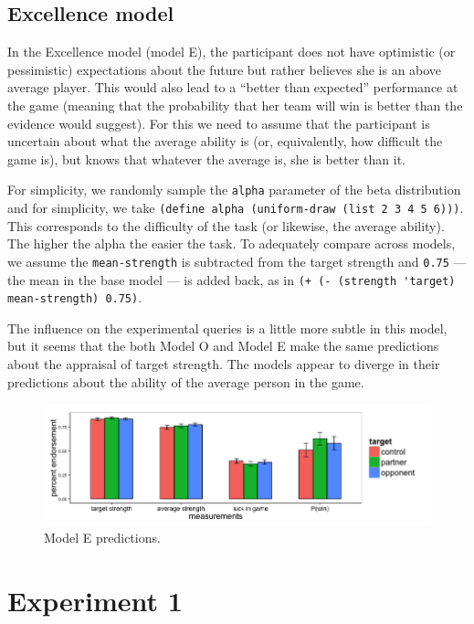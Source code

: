 \documentclass{article}
\begin{document}
\subsection{Excellence model}
In the Excellence model (model E), the participant does not have optimistic (or pessimistic) expectations about the future but rather believes she is an above average player. This would also lead to a ``better than expected'' performance at the game (meaning that the probability that her team will win is better than the evidence would suggest). For this we need to assume that the participant is uncertain about what the average ability is (or, equivalently, how difficult the game is), but knows that whatever the average is, she is better than it.

For simplicity, we randomly sample the \lstinline{alpha} parameter of the beta distribution and for simplicity, we take
\lstinline{(define alpha (uniform-draw (list 2 3 4 5 6)))}. This corresponds to the difficulty of the task (or likewise, the average ability). The higher the alpha the easier the task. To adequately compare across models, we assume the \lstinline{mean-strength} is subtracted from the target strength and \lstinline{0.75} --- the mean in the base model --- is added back, as in \lstinline{(+ (- (strength 'target) mean-strength) 0.75)}.

The influence on the experimental queries is a little more subtle in this model, but it seems that the both Model O and Model E make the same predictions about the appraisal of target strength. The models appear to diverge in their predictions about the ability of the average person in the game.

\begin{figure}
\centering
    \includegraphics[width=\columnwidth]{modelE-predictions}
    \caption{Model E predictions.}
      \label{fig:modele}
\end{figure}


\section{Experiment 1}
\end{document}
